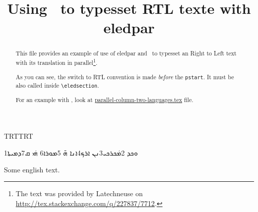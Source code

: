 \documentclass{article}
\newcommand{\textsyriac}[1] %
           {\bgroup\luatextextdir TRT\syriacfont #1\egroup}
\newenvironment{syriac}     %
           {\luatextextdir TRT\luatexpardir TRT\syriacfont}{}
\begin{document}
\date{}
\title{Using \LuaLaTeX\ to typesset RTL texte with eledpar}
\maketitle
\begin{abstract}
This file provides an example of use of eledpar and \LuaLaTeX\ to typesset an Right to Left text with its translation in parallel\footnote{The text was provided by Latechneuse on \url{http://tex.stackexchange.com/q/227837/7712}.}.  

As you can see, the switch to RTL convention is made \emph{before} the \verb+pstart+.
It must be also called inside \verb+\eledsection+.

For an example with \XeLaTeX, look at \href{./parallel-column-two-languages.tex}{parallel-column-two-languages.tex} file.
\end{abstract}
\begin{pages}
\begin{Leftside}
\begin{syriac}
\beginnumbering
   \pstart 
       \eledsection*{\textsyriac{ܡܿܟܪܟܝ}}
   \pend

   \pstart
        1ܘܟܕ 2ܡܿܟܪܟܝ3ܢܢ ܐܪܟ4ܐܢܐ ܗ̄ 5ܡܘܪܐ6 ܗܿܝ ܩ7ܕܡܝܬܐ
   \pend
\endnumbering
\end{syriac}
\end{Leftside}

\begin{Rightside}
\beginnumbering
   \pstart
   \pend

   \pstart
        Some english text. 
   \pend
\endnumbering
\end{Rightside}

\Pages
\end{pages} 
\end{document}
